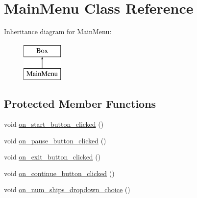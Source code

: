 \hypertarget{classMainMenu}{}\section{Main\+Menu Class Reference}
\label{classMainMenu}
Inheritance diagram for Main\+Menu\+:\begin{figure}[H]
\begin{center}
\leavevmode
\includegraphics[height=2.000000cm]{classMainMenu}
\end{center}
\end{figure}
\subsection*{Protected Member Functions}
\begin{DoxyCompactItemize}
\item 
void \mbox{\hyperlink{classMainMenu_a49ada5047a5c54593462bf05ccf93c49}{on\+\_\+start\+\_\+button\+\_\+clicked}} ()
\item 
void \mbox{\hyperlink{classMainMenu_a4c0bad31b1bbd49b3e8351ca137d4ac0}{on\+\_\+pause\+\_\+button\+\_\+clicked}} ()
\item 
void \mbox{\hyperlink{classMainMenu_a9b9f6812f90946e135022cf5826d8eed}{on\+\_\+exit\+\_\+button\+\_\+clicked}} ()
\item 
void \mbox{\hyperlink{classMainMenu_ae4449104fee56ee7576bd8d3d3545016}{on\+\_\+continue\+\_\+button\+\_\+clicked}} ()
\item 
void \mbox{\hyperlink{classMainMenu_abf942855bc24b2446fa96966fe7e8a39}{on\+\_\+num\+\_\+ships\+\_\+dropdown\+\_\+choice}} ()
\end{DoxyCompactItemize}
